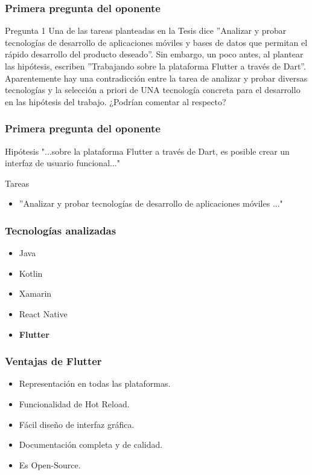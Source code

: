 \documentclass[14pt]{beamer}
\begin{document}
\begin{frame}
\frametitle{Primera pregunta del oponente}
\begin{block}{Pregunta 1}
 Una de las tareas planteadas en la Tesis dice ''Analizar y probar tecnologías de desarrollo de aplicaciones móviles y bases de datos que permitan el rápido desarrollo del producto deseado''. Sin embargo, un poco antes, al plantear las hipótesis, escriben ''Trabajando sobre la plataforma Flutter a través de Dart''. Aparentemente hay una contradicción entre la tarea de analizar y probar diversas tecnologías y la selección a priori de UNA tecnología concreta para el desarrollo en las hipótesis del trabajo. ¿Podrían comentar al respecto?
\end{block}
\end{frame}


\begin{frame}
\frametitle{Primera pregunta del oponente}
\begin{block}{Hipótesis}
"...sobre la plataforma Flutter a través de Dart, es posible crear un interfaz de usuario funcional..."
\end{block}

\begin{alertblock}{Tareas}
\begin{itemize}
\item ''Analizar y probar tecnologías de desarrollo de aplicaciones móviles ..."
\end{itemize}

\end{alertblock}
\end{frame}

\begin{frame}
\frametitle{Tecnologías analizadas}
\begin{itemize}
\item Java
\item Kotlin
\item Xamarin
\item React Native
\item \textbf{Flutter}

\end{itemize}

\end{frame}






\begin{frame}
\frametitle{Ventajas de Flutter}

\begin{itemize}
\item Representación en todas las plataformas.
\item Funcionalidad de Hot Reload.
\item Fácil diseño de interfaz gráfica.
\item Documentación completa y de calidad.
\item Es Open-Source.
\end{itemize}

\end{frame}
\end{document}
